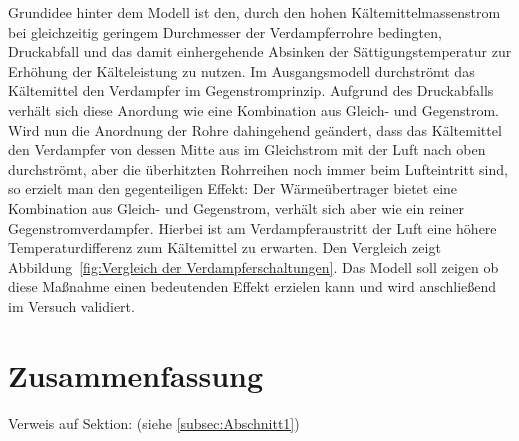 Grundidee hinter dem Modell ist den, durch den hohen Kältemittelmassenstrom bei gleichzeitig geringem Durchmesser der Verdampferrohre bedingten, Druckabfall und das damit einhergehende Absinken der Sättigungstemperatur zur Erhöhung der Kälteleistung zu nutzen. Im Ausgangsmodell durchströmt das Kältemittel den Verdampfer im Gegenstromprinzip. Aufgrund des Druckabfalls verhält sich diese Anordung wie eine Kombination aus Gleich- und Gegenstrom. Wird nun die Anordnung der Rohre dahingehend geändert, dass das Kältemittel den Verdampfer von dessen Mitte aus im Gleichstrom mit der Luft nach oben durchströmt, aber die überhitzten Rohrreihen noch immer beim Lufteintritt sind, so erzielt man den gegenteiligen Effekt: Der Wärmeübertrager bietet eine Kombination aus Gleich- und Gegenstrom, verhält sich aber wie ein reiner Gegenstromverdampfer. Hierbei ist am Verdampferaustritt der Luft eine höhere Temperaturdifferenz zum Kältemittel zu erwarten. Den Vergleich zeigt Abbildung~\ref{fig:Vergleich der Verdampferschaltungen}.
Das Modell soll zeigen ob diese Maßnahme einen bedeutenden Effekt erzielen kann und wird anschließend im Versuch validiert.




\chapter{Zusammenfassung}
\label{cha:Zusammenfassung}
Verweis auf Sektion: (siehe \ref{subsec:Abschnitt1})